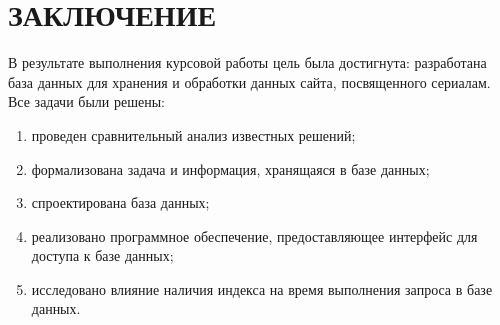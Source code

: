 \chapter*{ЗАКЛЮЧЕНИЕ}

В результате выполнения курсовой работы цель была достигнута: разработана база данных для хранения и обработки данных сайта, посвященного сериалам.
Все задачи были решены:
\begin{enumerate}
    \item проведен сравнительный анализ известных решений;
    \item формализована задача и информация, хранящаяся в базе данных;
    \item спроектирована база данных;
    \item реализовано программное обеспечение, предоставляющее интерфейс для доступа к базе данных;
    \item исследовано влияние наличия индекса на время выполнения запроса в базе данных.
\end{enumerate}
